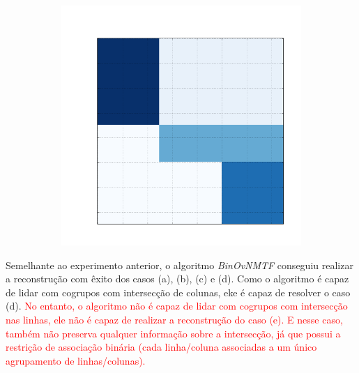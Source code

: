 \documentclass[
    12pt,                %
    oneside,            %
    a4paper,            %
    english,            %
    brazil                %
    ]{abntex2ppgsi}
\begin{document}
\begin{figure}[H]
\begin{subfigure}[b]{0.18\textwidth}
        \caption{}
    \end{subfigure}
    \begin{subfigure}[b]{0.18\textwidth}
        \includegraphics[width=\textwidth]{img/e-reconstruction-binovnmtf.png}
        \caption{}
    \end{subfigure}
    \label{fig:reconstruction:binovnmtf}
\end{figure}

Semelhante ao experimento anterior, o algoritmo \textit{BinOvNMTF} conseguiu realizar a reconstrução com êxito dos casos (a), (b), (c) e (d). Como o algoritmo é capaz de lidar com cogrupos com intersecção de colunas, eke é capaz de resolver o caso (d). \textcolor{red}{No entanto, o algoritmo não é capaz de lidar com cogrupos com intersecção nas linhas, ele não é capaz de realizar a reconstrução do caso (e). E nesse caso, também não preserva qualquer informação sobre a intersecção, já que possui a restrição de associação binária (cada linha/coluna associadas a um único agrupamento de linhas/colunas).} 

\end{document}
